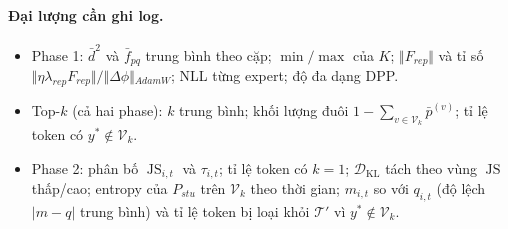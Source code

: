 \documentclass[12pt,a4paper]{article}
\theoremstyle{plain}
\DeclareMathOperator{\KL}{KL}
\DeclareMathOperator{\JS}{JS}
\newcommand{\Vk}{\mathcal V_k}
\newcommand{\ytar}{y^{*}}
\begin{document}
\paragraph{Đại lượng cần ghi log.}
\begin{itemize}
\item Phase 1: $\bar d^2$ và $\bar f_{pq}$ trung bình theo cặp; $\min/\max$ của $K$; $\Vert{}F_{rep}\Vert{}$ và tỉ số $\Vert{}\eta\lambda_{rep}F_{rep}\Vert{}/\Vert{}\Delta\phi\Vert{}_{AdamW}$; NLL từng expert; độ đa dạng DPP.
\item Top-$k$ (cả hai phase): $k$ trung bình; khối lượng đuôi $1-\sum_{v\in\Vk}\bar p^{(v)}$; tỉ lệ token có $\ytar\notin\Vk$.
\item Phase 2: phân bố $\JS_{i,t}$ và $\tau_{i,t}$; tỉ lệ token có $k=1$; $\mathcal D_{\KL}$ tách theo vùng $\JS$ thấp/cao; entropy của $P_{stu}$ trên $\Vk$ theo thời gian; $m_{i,t}$ so với $q_{i,t}$ (độ lệch $\vert{}m-q\vert{}$ trung bình) và tỉ lệ token bị loại khỏi $\mathcal T'$ vì $\ytar\notin\Vk$.
\end{itemize}
\end{document}
